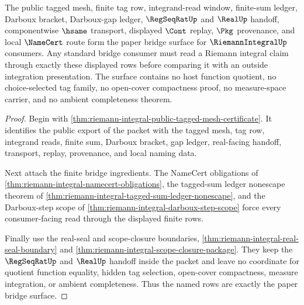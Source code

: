 \begin{theorem}
\label{thm:riemann-integral-bridge-schema-handoff}
The public tagged mesh, finite tag row, integrand-read window, finite-sum ledger, Darboux bracket, Darboux-gap ledger, $\RegSeqRatUp$ and $\RealUp$ handoff, componentwise $\hsame$ transport, displayed $\Cont$ replay, $\Pkg$ provenance, and local $\NameCert$ route form the paper bridge surface for $\RiemannIntegralUp$ consumers. Any standard bridge consumer must read a Riemann integral claim through exactly these displayed rows before comparing it with an outside integration presentation. The surface contains no host function quotient, no choice-selected tag family, no open-cover compactness proof, no measure-space carrier, and no ambient completeness theorem.
\end{theorem}
\begin{proof}
Begin with \autoref{thm:riemann-integral-public-tagged-mesh-certificate}. It identifies the public export of the packet with the tagged mesh, tag row, integrand reads, finite sum, Darboux bracket, gap ledger, real-facing handoff, transport, replay, provenance, and local naming data.

Next attach the finite bridge ingredients. The NameCert obligations of \autoref{thm:riemann-integral-namecert-obligations}, the tagged-sum ledger nonescape theorem of \autoref{thm:riemann-integral-tagged-sum-ledger-nonescape}, and the Darboux-step scope of \autoref{thm:riemann-integral-darboux-step-scope} force every consumer-facing read through the displayed finite rows.

Finally use the real-seal and scope-closure boundaries, \autoref{thm:riemann-integral-real-seal-boundary} and \autoref{thm:riemann-integral-scope-closure-package}. They keep the $\RegSeqRatUp$ and $\RealUp$ handoff inside the packet and leave no coordinate for quotient function equality, hidden tag selection, open-cover compactness, measure integration, or ambient completeness. Thus the named rows are exactly the paper bridge surface.
\end{proof}

